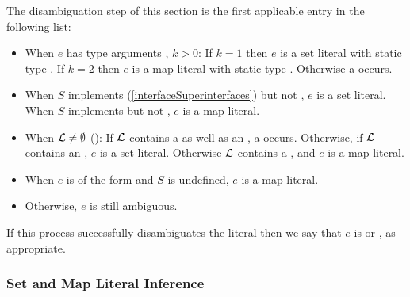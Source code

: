 \documentclass[makeidx]{article}
\begin{document}
{\LMHash{}%
The disambiguation step of this section is
the first applicable entry in the following list:

\begin{itemize}
\item When $e$ has type arguments , $k > 0$:
  If $k = 1$ then $e$ is a set literal with static type
  .
  If $k = 2$ then $e$ is a map literal with static type
  .
  Otherwise a  occurs.
\item
  When $S$ implements
  (\ref{interfaceSuperinterfaces})
   but not ,
  $e$ is a set literal.
  When $S$ implements  but not ,
  $e$ is a map literal.
\item
  When ${\cal L} \not= \emptyset$ ():
  If $\cal L$ contains a 
  as well as an ,
  a  occurs.
  Otherwise, if $\cal L$ contains an ,
  $e$ is a set literal.
  Otherwise $\cal L$ contains a , and $e$ is a map literal.
\item
  When $e$ is of the form \code{\{\}} and $S$ is undefined,
  $e$ is a map literal.
\item
  Otherwise, $e$ is still ambiguous.
\end{itemize}


\LMHash{}%
If this process successfully disambiguates the literal
then we say that $e$ is
or
,
as appropriate.


\subsubsection{Set and Map Literal Inference}

}
\end{document}
